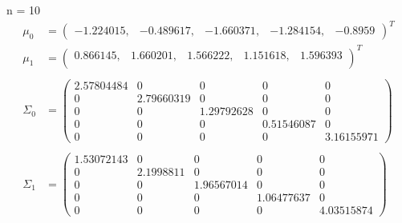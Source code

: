 \documentclass[12pt]{article}
\begin{document}
\begin{enumerate}[leftmargin=*]
    \vspace*{1cm}
    n = 10
    \begin{align*}
        \mu_0 &= \begin{pmatrix}
            -1.224015, & -0.489617, & -1.660371, & -1.284154, & -0.8959
        \end{pmatrix}^T \\
        \mu_1 &= \begin{pmatrix}
            0.866145, & 1.660201, & 1.566222, & 1.151618, & 1.596393 \\
        \end{pmatrix}^T \\ \\
        \Sigma_0 &= \begin{pmatrix}
            2.57804484 & 0 & 0 & 0 & 0 \\
            0 & 2.79660319 & 0 & 0 & 0 \\
            0 & 0 & 1.29792628 & 0 & 0 \\
            0 & 0 & 0 & 0.51546087 & 0 \\
            0 & 0 & 0 & 0 & 3.16155971 
        \end{pmatrix} \\ \\
        \Sigma_1 &= \begin{pmatrix}
            1.53072143 & 0 & 0 & 0 & 0 \\
            0 & 2.1998811 & 0 & 0 & 0 \\
            0 & 0 & 1.96567014 & 0 & 0 \\
            0 & 0 & 0 & 1.06477637 & 0 \\
            0 & 0 & 0 & 0 & 4.03515874
        \end{pmatrix}
    \end{align*}


\end{enumerate}
\end{document}

